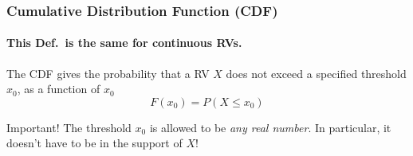 \documentclass[handout]{beamer}
\begin{document}

\begin{frame}
\frametitle{Cumulative Distribution Function (CDF)}
\framesubtitle{This Def.\ is \alert{the same} for continuous RVs.}

The CDF gives the probability that a RV $X$ \alert{does not exceed} a specified threshold $x_0$, as a function of $x_0$
	$$F(x_0) = P(X \leq x_0)$$


 

\begin{alertblock}{Important!}
The threshold $x_0$ is allowed to be \emph{any real number}. In particular, it doesn't have to be in the support of $X$! 
\end{alertblock}

\end{frame}
\end{document}

